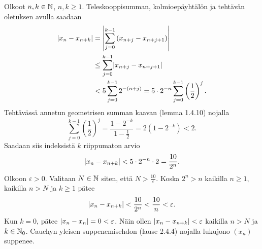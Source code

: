 \documentclass[11pt,a4paper]{amsart}
\begin{document}
\begin{solution}
Olkoot \(n,k \in \NN\), \(n,k \geq 1\). Teleskooppisumman,
kolmioepäyhtälön ja tehtävän oletuksen avulla saadaan
\[
\begin{aligned}
\abs{x_n - x_{n + k}} &= \abs*{\sum_{j = 0}^{k - 1}
\left(x_{n + j} - x_{n + j + 1}\right)} \\
&\leq \sum_{j = 0}^{k - 1} \abs{x_{n + j} - x_{n + j + 1}} \\
&< 5\sum_{j = 0}^{k - 1} 2^{-(n + j)}
= 5\cdot2^{-n}\sum_{j = 0}^{k - 1} \left(\frac12\right)^j.
\end{aligned}
\]
Tehtävässä annetun geometrisen summan kaavan (lemma 1.4.10) nojalla
\[
\sum_{j = 0}^{k - 1} \left(\frac12\right)^j
= \frac{1-2^{-k}}{1-\frac12}
= 2(1-2^{-k}) < 2.
\]
Saadaan siis indeksistä \(k\) riippumaton arvio
\[
\abs{x_n-x_{n+k}} < 5\cdot2^{-n}\cdot2 = \frac{10}{2^n}.
\]
Olkoon \(\varepsilon > 0\). Valitaan \(N \in \NN\) siten, että
\(N > \frac{10}{\varepsilon}\). Koska \(2^n > n\) kaikilla \(n \geq 1\),
kaikilla \(n > N\) ja \(k \geq 1\) pätee
\[
\abs{x_n - x_{n + k}} < \frac{10}{2^n} < \frac{10}{n} < \varepsilon.
\]
Kun \(k=0\), pätee \(\abs{x_n-x_n}=0<\varepsilon\). Näin ollen
\(\abs{x_n-x_{n+k}}<\varepsilon\) kaikilla \(n>N\) ja \(k\in\NN_0\).
Cauchyn yleisen suppenemisehdon (lause 2.4.4) nojalla lukujono
\((x_n)\) suppenee.
\end{solution}
\end{document}
